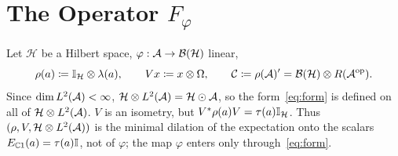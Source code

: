 \documentclass[12pt]{article}
\newcommand{\alg}{\mathcal{A}}             %
\newcommand{\hilb}{\mathcal{H}}            %
\newcommand{\bdd}[1]{\mathcal{B}\br{#1}}   %
\newcommand{\algtensor}{\odot}             %
\newcommand{\op}{^{\mathrm{op}}}           %
\newcommand{\Ltwo}{L^2\br{\alg}}
\newcommand{\Ltn}{\hilb \tensor \Ltwo}
\newcommand{\Fphi}{F_{\varphi}}
\newcommand{\comm}{\mathcal{C}}            %
\newcommand{\Esc}{E_{\complex 1}}          %
\begin{document}
\section{The Operator \texorpdfstring{\(\Fphi\)}{F}}
\label{sec:F}

Let \(\hilb\) be a Hilbert space, \(\varphi : \alg \to \bdd\hilb\) linear,
\[
  \rho(a) \eqdef \id_{\hilb} \tensor \lambda(a), \qquad
  Vx \eqdef x \tensor \Omega, \qquad
  \comm \eqdef \rho(\alg)' = \bdd\hilb \tensor R(\alg\op).
\]
Since \(\dim\Ltwo < \infty\), \(\Ltn = \hilb \algtensor \alg\), so the
form~\eqref{eq:form} is defined on all of \(\Ltn\). \(V\) is an isometry, but
\(V^\adjoint\rho(a)V = \tau(a)\id_{\hilb}\). Thus \((\rho, V, \Ltn)\) is the
minimal dilation of the expectation onto the scalars \(\Esc(a) = \tau(a)\id\), not of \(\varphi\);
the map \(\varphi\) enters only through~\eqref{eq:form}.
\end{document}

